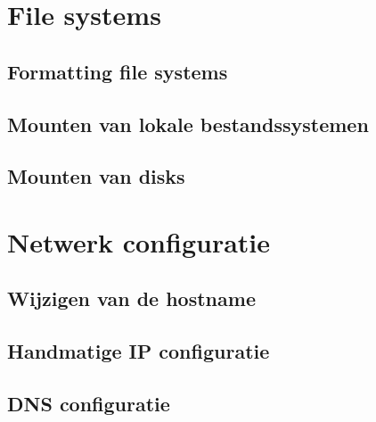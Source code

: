 \documentclass[a4paper,12pt,twoside,openright,titlepage]{book}
\begin{document}
\chapter{File systems}

\section{Formatting file systems}

\section{Mounten van lokale bestandssystemen}

\section{Mounten van disks}


\chapter{Netwerk configuratie}

\section{Wijzigen van de hostname}

\section{Handmatige IP configuratie}





\section{DNS configuratie}

%
\end{document}
